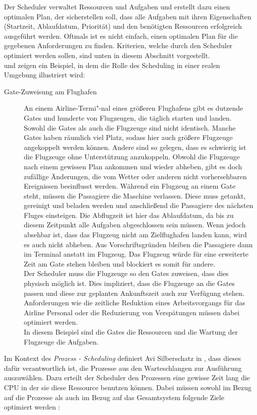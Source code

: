 Der Scheduler verwaltet Ressourcen und Aufgaben und erstellt dazu einen optimalen Plan, der sicherstellen soll, dass alle Aufgaben mit ihren Eigenschaften (Startzeit, Ablaufdatum, Priorität) und den benötigten Ressourcen erfolgreich ausgeführt werden. Oftmals ist es nicht einfach, einen optimalen Plan für die gegebenen Anforderungen zu finden. Kriterien, welche durch den Scheduler optimiert werden sollen, sind unten in diesem Abschnitt vorgestellt.\\
\cite{mpinedo} und \cite{aagnetis} zeigen ein Beispiel, in dem die Rolle des Scheduling in einer realen Umgebung illustriert wird:
\begin{description}
\item[Gate-Zuweisung am Flughafen]
An einem Airline-Termi"-nal eines größeren Flughafens gibt es dutzende Gates und hunderte von Flugzeugen, die täglich starten und landen. Sowohl die Gates als auch die Flugzeuge sind nicht identisch. Manche Gates haben räumlich viel Platz, sodass hier auch größere Flugzeuge angekoppelt werden können. Andere sind so gelegen, dass es schwierig ist die Flugzeuge ohne Unterstützung anzukoppeln. Obwohl die Flugzeuge nach einem gewissen Plan ankommen und wieder abheben, gibt es doch zufällige Änderungen, die vom Wetter oder anderen nicht vorhersehbaren Ereignissen beeinflusst werden. Während ein Flugzeug an einem Gate steht, müssen die Passagiere die Maschine verlassen. Diese muss getankt, gereinigt und beladen werden und anschließend die Passagiere des nächsten Fluges einsteigen. Die Abflugzeit ist hier das Ablaufdatum, da bis zu diesem Zeitpunkt alle Aufgaben abgeschlossen sein müssen. Wenn jedoch absehbar ist, dass das Flugzeug nicht am Zielflughafen landen kann, wird es auch nicht abheben. Aus Vorschriftsgründen bleiben die Passagiere dann im Terminal anstatt im Flugzeug. Das Flugzeug würde für eine erweiterte Zeit am Gate stehen bleiben und blockiert es somit für andere.\\
Der Scheduler muss die Flugzeuge so den Gates zuweisen, dass dies physisch möglich ist. Dies impliziert, dass die Flugzeuge an die Gates passen und diese zur geplanten Ankunftszeit auch zur Verfügung stehen. Anforderungen wie die zeitliche Reduktion eines Arbeitsvorgangs für das Airline Personal oder die Reduzierung von Verspätungen müssen dabei optimiert werden.\\
In diesem Beispiel sind die Gates die Ressourcen und die Wartung der Flugzeuge die Aufgaben. 
\end{description}
Im Kontext des \textit{Prozess - Scheduling} definiert Avi Silberschatz in \cite{asilberschatz}, dass dieses dafür verantwortlich ist, die Prozesse aus den Warteschlangen zur Ausführung auszuwählen. Dazu erteilt der Scheduler den Prozessen eine gewisse Zeit lang die CPU in der sie diese Ressource benutzen können. Dabei müssen sowohl im Bezug auf die Prozesse als auch im Bezug auf das Gesamtsystem folgende Ziele optimiert werden \cite{asilberschatz} \cite{rlove}:\\
